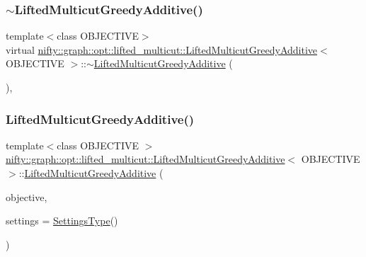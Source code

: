 \subsubsection{\texorpdfstring{$\sim$\+Lifted\+Multicut\+Greedy\+Additive()}{~LiftedMulticutGreedyAdditive()}}
{\footnotesize\ttfamily template$<$class O\+B\+J\+E\+C\+T\+I\+VE$>$ \\
virtual \hyperlink{classnifty_1_1graph_1_1opt_1_1lifted__multicut_1_1LiftedMulticutGreedyAdditive}{nifty\+::graph\+::opt\+::lifted\+\_\+multicut\+::\+Lifted\+Multicut\+Greedy\+Additive}$<$ O\+B\+J\+E\+C\+T\+I\+VE $>$\+::$\sim$\hyperlink{classnifty_1_1graph_1_1opt_1_1lifted__multicut_1_1LiftedMulticutGreedyAdditive}{Lifted\+Multicut\+Greedy\+Additive} (\begin{DoxyParamCaption}{ }\end{DoxyParamCaption})\hspace{0.3cm}{\ttfamily [inline]}, {\ttfamily [virtual]}}

\mbox{\label{classnifty_1_1graph_1_1opt_1_1lifted__multicut_1_1LiftedMulticutGreedyAdditive_a5d91d77cabd95b20fc04ca9c9a2b868a}} 
\subsubsection{\texorpdfstring{Lifted\+Multicut\+Greedy\+Additive()}{LiftedMulticutGreedyAdditive()}}
{\footnotesize\ttfamily template$<$class O\+B\+J\+E\+C\+T\+I\+VE $>$ \\
\hyperlink{classnifty_1_1graph_1_1opt_1_1lifted__multicut_1_1LiftedMulticutGreedyAdditive}{nifty\+::graph\+::opt\+::lifted\+\_\+multicut\+::\+Lifted\+Multicut\+Greedy\+Additive}$<$ O\+B\+J\+E\+C\+T\+I\+VE $>$\+::\hyperlink{classnifty_1_1graph_1_1opt_1_1lifted__multicut_1_1LiftedMulticutGreedyAdditive}{Lifted\+Multicut\+Greedy\+Additive} (\begin{DoxyParamCaption}\item[{const \hyperlink{classnifty_1_1graph_1_1opt_1_1lifted__multicut_1_1LiftedMulticutGreedyAdditive_a0aa12ac484718da875bfca390b69811e}{Objective\+Type} \&}]{objective,  }\item[{const \hyperlink{classnifty_1_1graph_1_1opt_1_1lifted__multicut_1_1LiftedMulticutGreedyAdditive_aeac1b92946ca3d5e8e9e30f7cc30294d}{Settings\+Type} \&}]{settings = {\ttfamily \hyperlink{classnifty_1_1graph_1_1opt_1_1lifted__multicut_1_1LiftedMulticutGreedyAdditive_aeac1b92946ca3d5e8e9e30f7cc30294d}{Settings\+Type}()} }\end{DoxyParamCaption})}



